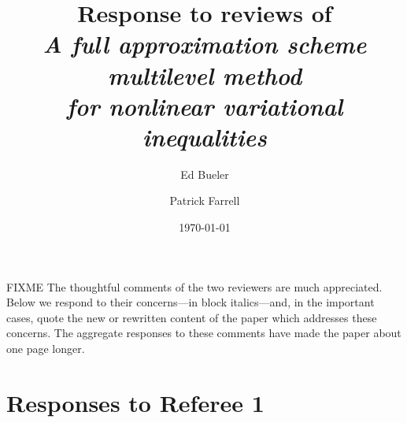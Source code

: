\documentclass[letterpaper,final,12pt,reqno]{amsart}
\begin{document}
\title[Response to reviews]{Response to reviews of \\ \emph{A full approximation scheme multilevel method \\ for nonlinear variational inequalities}}

\author{Ed Bueler}

\author{Patrick Farrell}

\date{\today}

\maketitle


\thispagestyle{empty}

FIXME The thoughtful comments of the two reviewers are much appreciated.  Below we respond to their concerns---in block italics---and, in the important cases, quote the new or rewritten content of the paper which addresses these concerns.  The aggregate responses to these comments have made the paper about one page longer.


\section{Responses to Referee 1}

\end{document}
